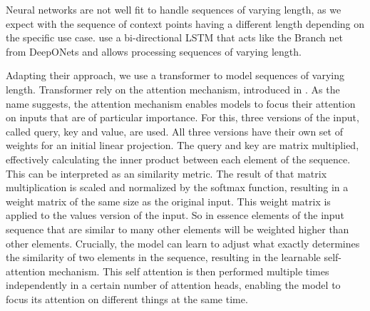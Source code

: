 Neural networks are not well fit to handle sequences of varying length, as we expect with the sequence of context points having a different length depending on the specific use case. \citet{seifner2025zeroshotimputationfoundationinference} use a bi-directional LSTM that acts like the Branch net from DeepONets and allows processing sequences of varying length. 

Adapting their approach, we use a transformer to model sequences of varying length. Transformer rely on the attention mechanism, introduced in \citet{vaswani2017attention}. As the name suggests, the attention mechanism enables models to focus their attention on inputs that are of particular importance. For this, three versions of the input, called query, key and value, are used. All three versions have their own set of weights for an initial linear projection. The query and key are matrix multiplied, effectively calculating the inner product between each element of the sequence. This can be interpreted as an similarity metric. The result of that matrix multiplication is scaled and normalized by the softmax function, resulting in a weight matrix of the same size as the original input. This weight matrix is applied to the values version of the input. So in essence elements of the input sequence that are similar to many other elements will be weighted higher than other elements. Crucially, the model can learn to adjust what exactly determines the similarity of two elements in the sequence, resulting in the learnable self-attention mechanism. This self attention is then performed multiple times independently in a certain number of attention heads, enabling the model to focus its attention on different things at the same time. \cite{vaswani2017attention}